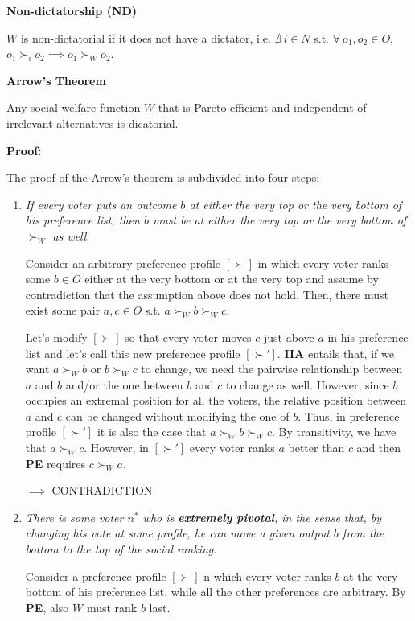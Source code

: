 \bigskip
\noindent \textbf{Non-dictatorship (ND)}

\noindent $W$ is non-dictatorial if it does not have a dictator, i.e. 
$\nexists ~i \in N$ s.t. $\forall ~o_1,o_2 \in O$, $o_1 \succ_i o_2 \implies 
o_1 \succ_W o_2$.

\bigskip
\noindent \textbf{Arrow's Theorem}

\noindent Any social welfare function $W$ that is Pareto efficient and 
independent of irrelevant alternatives is dicatorial.

\bigskip
\noindent \textbf{Proof:}

\noindent The proof of the Arrow's theorem is subdivided into four steps:
\begin{enumerate}
	\item \textit{If every voter puts an outcome $b$ at either the very top or 
	the very bottom of his preference list, then $b$ must be at either the very 
	top or the very bottom of $\succ_W$ as well}.

	\noindent Consider an arbitrary preference profile $[\succ]$ in which every 
	voter ranks some $b \in O$ either at the very bottom or at the very top and 
	assume by contradiction that the assumption above does not hold. Then, there 
	must exist some pair $a,c \in O$ s.t. $a \succ_W b \succ_W c$.

	\noindent Let's modify $[\succ]$ so that every voter moves $c$ just above 
	$a$ in his preference list and let's call this new preference profile 
	$[\succ']$. \textbf{IIA} entails that, if we want $a \succ_W b$ or $b 
	\succ_W c$ to change, we need the pairwise relationship between $a$ and $b$ 
	and/or the one between $b$ and $c$ to change as well. However, since $b$ 
	occupies an extremal position for all the voters, the relative position 
	between $a$ and $c$ can be changed without modifying the one of $b$. Thus, 
	in preference profile $[\succ']$ it is also the case that $a \succ_W b 
	\succ_W c$. By transitivity, we have that $a \succ_W c$. However, in 
	$[\succ']$ every voter ranks $a$ better than $c$ and then \textbf{PE} 
	requires $c \succ_W a$.

	\noindent $\implies$ CONTRADICTION.

	\item \textit{There is some voter $n^*$ who is \textbf{extremely pivotal}, 
	in the sense that, by changing his vote at some profile, he can move a 
	given output $b$ from the bottom to the top of the social ranking}.

	\noindent Consider a preference profile $[\succ]$ n which every voter ranks 
	$b$ at the very bottom of his preference list, while all the other 
	preferences are arbitrary. By \textbf{PE}, also $W$ must rank $b$ last.


\end{enumerate}

